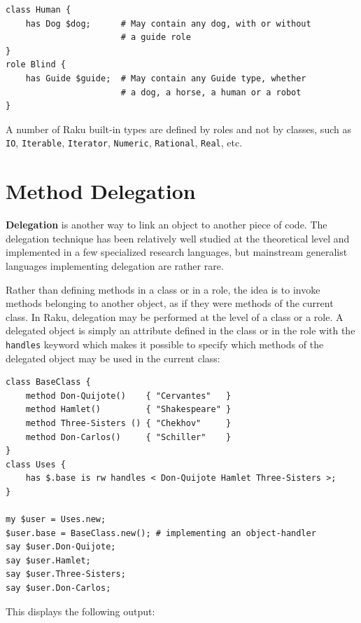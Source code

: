 \begin{verbatim}
class Human {
    has Dog $dog;      # May contain any dog, with or without
                       # a guide role
}
role Blind {
    has Guide $guide;  # May contain any Guide type, whether 
                       # a dog, a horse, a human or a robot
}
\end{verbatim}

A number of Raku built-in types are defined by roles and 
not by classes, such as {\tt IO}, {\tt Iterable}, 
{\tt Iterator}, {\tt Numeric}, {\tt Rational}, {\tt Real},
etc.

\section{Method Delegation}

{\bf Delegation} is another way to link an object to another piece 
of code. The delegation technique has been relatively well 
studied at the theoretical level and implemented in a few 
specialized research languages, but mainstream generalist 
languages implementing delegation are rather rare.

Rather than defining methods in a class or in a role, the 
idea is to invoke methods belonging to another object, as 
if they were methods of the current class. In Raku, delegation 
may be performed at the level of a class or a role. A delegated 
object is simply an attribute defined in the class or in the role 
with the {\tt handles} keyword which makes it possible to specify 
which methods of the delegated object may be used in the 
current class:

  
   
  
\begin{verbatim}
class BaseClass {
    method Don-Quijote()    { "Cervantes"   }
    method Hamlet()         { "Shakespeare" }
    method Three-Sisters () { "Chekhov"     }
    method Don-Carlos()     { "Schiller"    }
}
class Uses { 
    has $.base is rw handles < Don-Quijote Hamlet Three-Sisters >;
}

my $user = Uses.new;
$user.base = BaseClass.new(); # implementing an object-handler
say $user.Don-Quijote;
say $user.Hamlet;
say $user.Three-Sisters;
say $user.Don-Carlos;
\end{verbatim}

This displays the following output:

